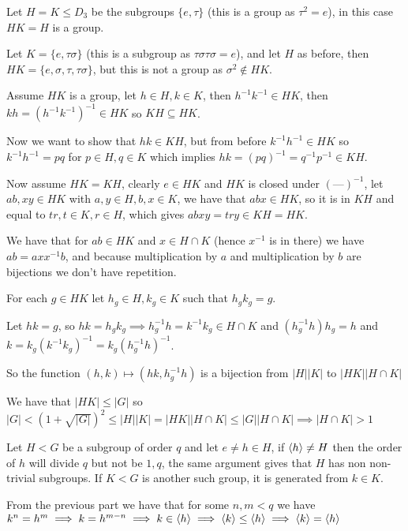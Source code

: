 \begin{cExercise}
	\begin{cPart}
		Let $H=K\le D_3$ be the subgroups $\{e,\tau\}$ (this is a group as $\tau^2=e$), in this case $HK=H$ is a group.
		
		Let $K=\{e,\tau\sigma\}$ (this is a subgroup as $\tau\sigma\tau\sigma=e$), and let $H$ as before, then $HK=\{e,\sigma,\tau,\tau\sigma\}$, but this is not a group as $\sigma^2\notin HK$.
	\end{cPart}
	\begin{cPart}
		Assume $HK$ is a group, let  $h\in H,k\in K$, then $h^{-1}k^{-1}\in HK$, then $kh=(h^{-1}k^{-1})^{-1}\in HK$ so $KH\subseteq HK$.
		
		Now we want to show that $hk\in KH$, but from before $k^{-1}h^{-1}\in HK$ so $k^{-1}h^{-1}=pq$ for $p\in H,q\in K$ which implies $hk=(pq)^{-1}=q^{-1}p^{-1}\in KH$.
		
		Now assume $HK=KH$, clearly $e\in HK$ and $HK$ is closed under $(\text{---})^{-1}$, let $ab,xy\in HK$ with $a,y\in H,b,x\in K$, we have that $abx\in HK$, so it is in $KH$ and equal to $tr, t\in K,r\in H$, which gives $abxy=try\in KH=HK$. 
	\end{cPart}
	\begin{cPart}
		We have that for $ab\in HK$ and $x\in H\cap K$ (hence $x^{-1}$ is in there) we have $ab=axx^{-1}b$, and because multiplication by $a$ and multiplication by $b$ are bijections we don't have repetition.
		
		For each $g\in HK$ let $h_g\in H,k_g\in K$ such that $h_gk_g=g$.
		
		Let $hk=g$, so $hk=h_gk_g\implies h_g^{-1}h=k^{-1}k_g\in H\cap K$ and $(h_g^{-1}h)h_g=h$ and $k=k_g(k^{-1}k_g)^{-1}=k_g(h_g^{-1}h)^{-1}$.
		
		So the function $(h,k)\mapsto (hk,h_g^{-1}h)$ is a bijection from $|H||K|$ to $|HK||H\cap K|$
	\end{cPart}
	\begin{cPart}
		We have that $|HK|\le |G|$ so $|G|<(1+\sqrt{|G|})^2\le |H||K|=|HK||H\cap K|\le|G||H\cap K|\implies |H\cap K|>1$
	\end{cPart}
	\begin{cPart}
		Let $H<G$ be a subgroup of order $q$ and let $e\ne h\in H$, if $\left\langle h\right\rangle\ne H$ then the order of $h$ will divide $q$ but not be $1,q$, the same argument gives that $H$ has non non-trivial subgroups. If $K<G$ is another such group, it is generated from $k\in K$.
		
		From the previous part we have that for some $n,m<q$ we have $k^n=h^m\implies k=h^{m-n}\implies k\in \left\langle h\right\rangle\implies \left\langle k\right\rangle\le\left\langle h\right\rangle\implies \left\langle k\right\rangle=\left\langle h\right\rangle$
	\end{cPart}
\end{cExercise}
